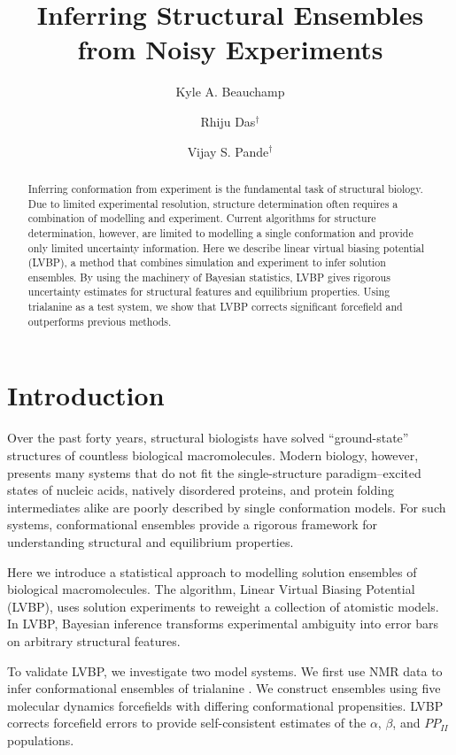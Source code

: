 \documentclass[journal=jacsat,manuscript=article]{achemso}
\author{Kyle A. Beauchamp}
\affiliation[Biophysics Program]{Biophysics Program}
\author{Rhiju Das$^\dagger$}
\affiliation[Biochemistry Department]{Biochemistry Department, Stanford University, Stanford, CA}
\author{Vijay S. Pande$^\dagger$}
\affiliation[Chemistry Department]{Chemistry Department, Stanford University, Stanford, CA}
\title{Inferring Structural Ensembles from Noisy Experiments}
\begin{document}
\maketitle

\begin{abstract}

Inferring conformation from experiment is the fundamental task of structural biology.  Due to limited experimental resolution, structure determination often requires a combination of modelling and experiment.  Current algorithms for structure determination, however, are limited to modelling a single conformation and provide only limited uncertainty information.  Here we describe linear virtual biasing potential (LVBP), a method that combines simulation and experiment to infer solution ensembles.  By using the machinery of Bayesian statistics, LVBP  gives rigorous uncertainty estimates for structural features and equilibrium properties.  Using trialanine as a test system, we show that LVBP corrects significant forcefield and outperforms previous methods.

\end{abstract}

\section{Introduction}

Over the past forty years, structural biologists have solved ``ground-state'' structures of countless biological macromolecules\cite{Berman2000}. Modern biology, however, presents many systems that do not fit the single-structure paradigm--excited states of nucleic acids\cite{dethoff2012}, natively disordered proteins\cite{fink2005}, and protein folding intermediates\cite{korzhnev2004} alike are poorly described by single conformation models.  For such systems, conformational ensembles provide a rigorous framework for understanding structural and equilibrium properties.  

Here we introduce a statistical approach to modelling solution ensembles of biological macromolecules.  The algorithm, Linear Virtual Biasing Potential (LVBP), uses solution experiments to reweight a collection of atomistic models.  In LVBP, Bayesian inference transforms experimental ambiguity into error bars on arbitrary structural features.  

To validate LVBP, we investigate two model systems.  We first use NMR data to infer conformational ensembles of trialanine \cite{Graf2007}.  We construct ensembles using five molecular dynamics forcefields with differing conformational propensities.  LVBP corrects forcefield errors to provide self-consistent estimates of the $\alpha$, $\beta$, and $PP_{II}$ populations.  
\end{document}
